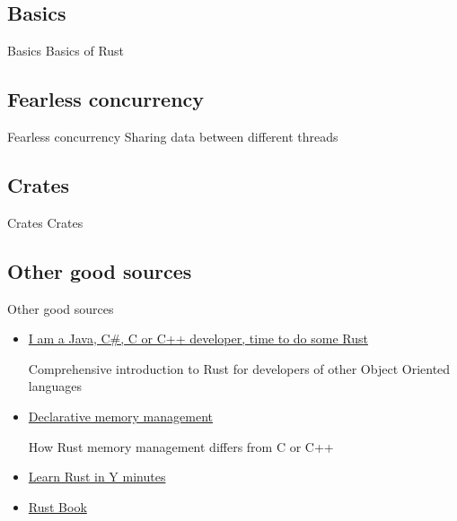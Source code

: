 \documentclass[
  9pt,
  ignorenonframetext,
]{beamer}
\begin{document}
\hypertarget{basics}{%
\subsection{Basics}\label{basics}}

\begin{frame}{Basics}
Basics of Rust
\end{frame}

\hypertarget{fearless-concurrency}{%
\subsection{Fearless concurrency}\label{fearless-concurrency}}

\begin{frame}{Fearless concurrency}
Sharing data between different threads
\end{frame}

\hypertarget{crates}{%
\subsection{Crates}\label{crates}}

\begin{frame}{Crates}
Crates
\end{frame}

\hypertarget{other-good-sources}{%
\subsection{Other good sources}\label{other-good-sources}}

\begin{frame}{Other good sources}
\begin{itemize}
\item
  \href{https://fasterthanli.me/articles/i-am-a-java-csharp-c-or-cplusplus-dev-time-to-do-some-rust}{I
  am a Java, C\#, C or C++ developer, time to do some Rust}

  Comprehensive introduction to Rust for developers of other Object
  Oriented languages
\item
  \href{https://fasterthanli.me/articles/declarative-memory-management}{Declarative
  memory management}

  How Rust memory management differs from C or C++
\item
  \href{https://learnxinyminutes.com/docs/rust/}{Learn Rust in Y
  minutes}
\item
  \href{https://doc.rust-lang.org/book/}{Rust Book}
\end{itemize}
\end{frame}
\end{document}
